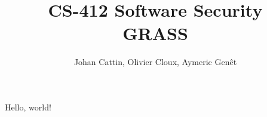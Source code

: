 \documentclass[11pt]{article}
\begin{document}
\author{Johan Cattin, Olivier Cloux, Aymeric Gen\^{e}t}
\title{CS-412 Software Security \\ \Huge GRASS}
\maketitle

Hello, world!
\end{document}
